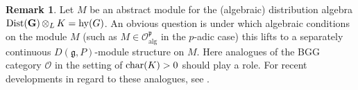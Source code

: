 \documentclass[a4paper, reqno, 10pt]{amsart}
\theoremstyle{definition}
\newtheorem{remark}[theorem]{Remark}
\numberwithin{equation}{section}
\newcommand{\botimes}[1]{{\,\otimes_{#1}\,}}
\newcommand{\cotimes}[1]{{\,\widehat{\otimes}_{#1}\,}}
\newcommand{\hy}{{\mathrm{hy}}}
\newcommand{\lra}{\longrightarrow}
\newcommand{\lto}{\longmapsto}
\newcommand{\CF}{{\mathcal {F}}}
\newcommand{\CO}{{\mathcal {O}}}
\newcommand{\bG}{{\mathrm{\bf G}}}
\newcommand{\Fg}{{\mathfrak {g}}}
\newcommand{\Fp}{{\mathfrak {p}}}
\newcommand{\alg}{{\mathrm{alg}}}
\begin{document}
\begin{remark}
	Let $M$ be an abstract module for the (algebraic) distribution algebra ${\rm Dist}(\bG) \botimes{L} K = \hy(G)$.
	An obvious question is under which algebraic conditions on the module $M$ (such as $M \in \CO_\alg^\Fp$ in the $p$-adic case) this lifts to a separately continuous $D(\Fg,P)$-module structure on $M$.
	Here analogues of the BGG category $\CO$ in the setting of ${\rm char}(K)>0$ should play a role.
	For recent developments in regard to these analogues, see \cite{Andersen22BGGCatPrimeChar,  Andersen22CharFormCatOp, Fiebig21PerSubquotModCatO, Orlik21EqVBDrinfeldFF}.
\end{remark}







\end{document}
